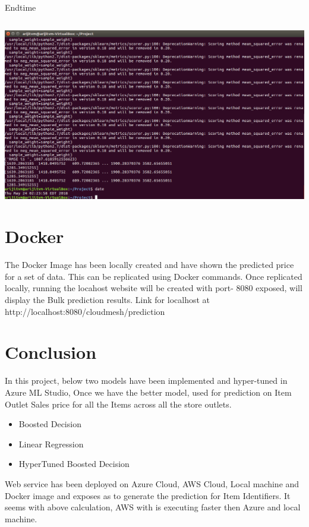 Endtime 
\begin{verbatim}

\end{verbatim}

\includegraphics[width=\columnwidth]{Images/EndTimelocal.png}

\section{Docker}

The Docker Image has been locally created and have shown the predicted 
price for a set of data. This can be replicated using Docker commands. 
Once replicated locally, running the locahost website will be created 
with port- 8080 exposed, will display the Bulk prediction results.
Link for localhost at http://localhost:8080/cloudmesh/prediction

\section{Conclusion}

In this project, below two models have been implemented and 
hyper-tuned in Azure ML Studio, Once we have the better model, used for 
prediction on Item Outlet Sales price for all the Items 
across all the store outlets.
\begin{itemize}
\item Boosted Decision
\item Linear Regression
\item HyperTuned Boosted Decision
\end{itemize}
Web service has been deployed on Azure Cloud, AWS Cloud, Local machine 
and Docker image and exposes 
as to generate the prediction for Item Identifiers. It seems with above 
calculation, AWS with is executing faster then Azure and local machine.

